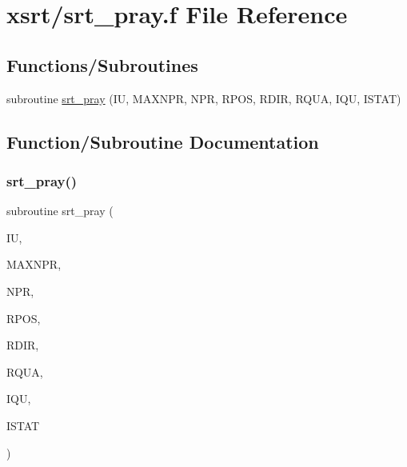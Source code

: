 \hypertarget{srt__pray_8f}{}\section{xsrt/srt\+\_\+pray.f File Reference}
\label{srt__pray_8f}
\subsection*{Functions/\+Subroutines}
\begin{DoxyCompactItemize}
\item 
subroutine \hyperlink{srt__pray_8f_acd787bfe8dddff293733da768b1e388b}{srt\+\_\+pray} (IU, M\+A\+X\+N\+PR, N\+PR, R\+P\+OS, R\+D\+IR, R\+Q\+UA, I\+QU, I\+S\+T\+AT)
\end{DoxyCompactItemize}


\subsection{Function/\+Subroutine Documentation}
\mbox{\label{srt__pray_8f_acd787bfe8dddff293733da768b1e388b}} 
\subsubsection{\texorpdfstring{srt\+\_\+pray()}{srt\_pray()}}
{\footnotesize\ttfamily subroutine srt\+\_\+pray (\begin{DoxyParamCaption}\item[{integer}]{IU,  }\item[{integer}]{M\+A\+X\+N\+PR,  }\item[{integer}]{N\+PR,  }\item[{double precision, dimension(3,maxnpr)}]{R\+P\+OS,  }\item[{double precision, dimension(3)}]{R\+D\+IR,  }\item[{double precision, dimension(3)}]{R\+Q\+UA,  }\item[{integer, dimension(maxnpr)}]{I\+QU,  }\item[{integer}]{I\+S\+T\+AT }\end{DoxyParamCaption})}

